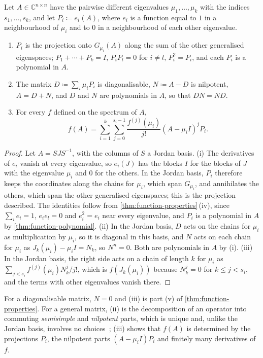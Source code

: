 \begin{proposition}
\label{prop:spectral-projections-general}
Let $A\in\mathbb C^{n\times n}$ have the pairwise different eigenvalues $\mu_1,\ldots,\mu_k$ with the indices $s_1,\ldots,s_k$, and let $P_i\coloneqq e_i(A)$, where $e_i$ is a function equal to $1$ in a neighbourhood of $\mu_i$ and to $0$ in a neighbourhood of each other eigenvalue.
\begin{enumerate}
\item $P_i$ is the projection onto $G_{\mu_i}(A)$ along the sum of the other generalised eigenspaces; $P_1+\cdots+P_k=I$, $P_iP_l=0$ for $i\ne l$, $P_i^2=P_i$, and each $P_i$ is a polynomial in $A$.
\item The matrix $D\coloneqq\sum_i\mu_iP_i$ is diagonalisable, $N\coloneqq A-D$ is nilpotent, $A=D+N$, and $D$ and $N$ are polynomials in $A$, so that $DN=ND$.
\item For every $f$ defined on the spectrum of $A$,
\[
f(A)=\sum_{i=1}^k\sum_{j=0}^{s_i-1}\frac{f^{(j)}(\mu_i)}{j!}(A-\mu_iI)^jP_i .
\]
\end{enumerate}
\end{proposition}

\begin{proof}
Let $A=SJS^{-1}$, with the columns of $S$ a Jordan basis. (i) The derivatives of $e_i$ vanish at every eigenvalue, so $e_i(J)$ has the blocks $I$ for the blocks of $J$ with the eigenvalue $\mu_i$ and $0$ for the others. In the Jordan basis, $P_i$ therefore keeps the coordinates along the chains for $\mu_i$, which span $G_{\mu_i}$, and annihilates the others, which span the other generalised eigenspaces; this is the projection described. The identities follow from \cref{thm:function-properties}\,(iv), since $\sum_ie_i=1$, $e_ie_l=0$ and $e_i^2=e_i$ near every eigenvalue, and $P_i$ is a polynomial in $A$ by \cref{thm:function-polynomial}. (ii) In the Jordan basis, $D$ acts on the chains for $\mu_i$ as multiplication by $\mu_i$, so it is diagonal in this basis, and $N$ acts on each chain for $\mu_i$ as $J_k(\mu_i)-\mu_iI=N_k$, so $N^n=0$. Both are polynomials in $A$ by (i). (iii) In the Jordan basis, the right side acts on a chain of length $k$ for $\mu_i$ as $\sum_{j<s_i}f^{(j)}(\mu_i)N_k^j/j!$, which is $f(J_k(\mu_i))$ because $N_k^j=0$ for $k\le j<s_i$, and the terms with other eigenvalues vanish there.
\end{proof}

For a diagonalisable matrix, $N=0$ and (iii) is part (v) of \cref{thm:function-properties}. For a general matrix, (ii) is the decomposition of an operator into commuting \emph{semisimple} and \emph{nilpotent} parts, which is unique and, unlike the Jordan basis, involves no choices~\cite[Sect.~6.8]{hoffman1971}; (iii) shows that $f(A)$ is determined by the projections $P_i$, the nilpotent parts $(A-\mu_iI)P_i$ and finitely many derivatives of $f$.

